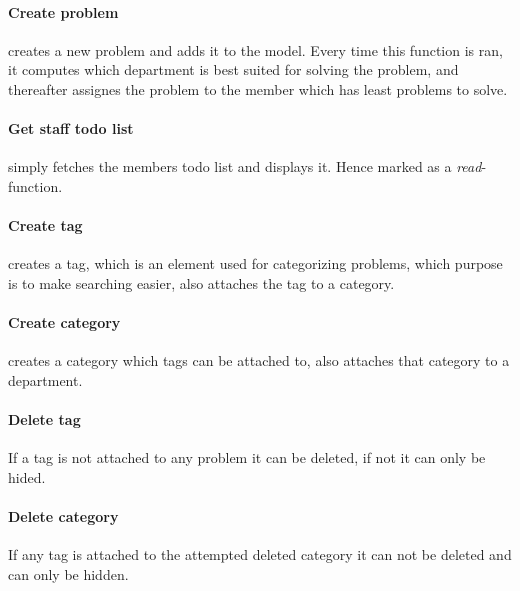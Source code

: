 \paragraph{Create problem} creates a new problem and adds it to the model. Every time this function is ran, it computes which department is best suited for solving the problem, and thereafter assignes the problem to the \astaff[] member which has least problems to solve.  


\paragraph{Get staff todo list} simply fetches the \astaff[] members todo list and displays it. Hence marked as a \textit{read}-function. 

\paragraph{Create tag} creates a tag, which is an element used for categorizing problems, which purpose is to make searching easier, also attaches the tag to a category. 

\paragraph{Create category} creates a category which tags can be attached to, also attaches that category to a department. 

\paragraph{Delete tag} If a tag is not attached to any problem it can be deleted, if not it can only be hided. 

\paragraph{Delete category} If any tag is attached to the attempted deleted category it can not be deleted and can only be hidden. 

